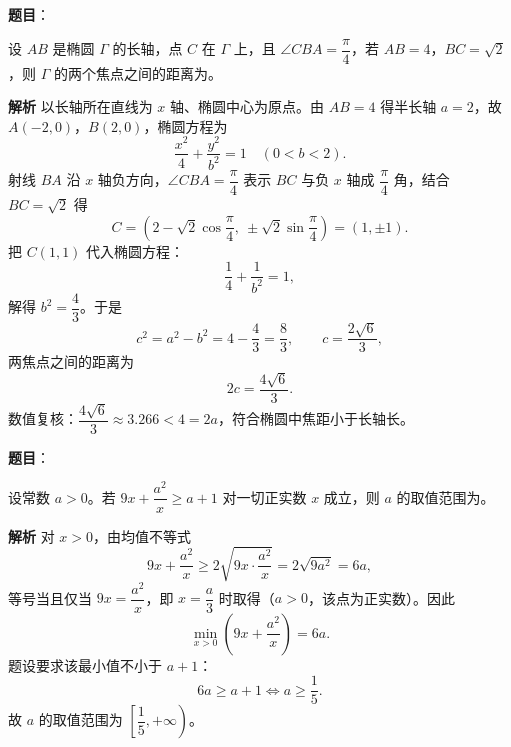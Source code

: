 \begin{answer}

\textbf{题目}：

设 $AB$ 是椭圆 $\Gamma$ 的长轴，点 $C$ 在 $\Gamma$ 上，且 $\angle CBA=\dfrac{\pi}{4}$，若 $AB=4$，$BC=\sqrt2$，则 $\Gamma$ 的两个焦点之间的距离为\gkblank{}。

\textbf{解析}
以长轴所在直线为 $x$ 轴、椭圆中心为原点。由 $AB=4$ 得半长轴 $a=2$，故 $A(-2,0)$，$B(2,0)$，椭圆方程为
\nopagebreak[4]
\[\frac{x^2}4+\frac{y^2}{b^2}=1\quad(0<b<2).\]
射线 $BA$ 沿 $x$ 轴负方向，$\angle CBA=\dfrac\pi4$ 表示 $BC$ 与负 $x$ 轴成 $\dfrac\pi4$ 角，结合 $BC=\sqrt2$ 得
\nopagebreak[4]
\[C=\left(2-\sqrt2\cos\frac\pi4,\ \pm\sqrt2\sin\frac\pi4\right)=(1,\pm1).\]
把 $C(1,1)$ 代入椭圆方程：
\nopagebreak[4]
\[\frac14+\frac1{b^2}=1,\]
解得 $b^2=\dfrac43$。于是
\nopagebreak[4]
\[c^2=a^2-b^2=4-\frac43=\frac83,\qquad c=\frac{2\sqrt6}3,\]
两焦点之间的距离为
\nopagebreak[4]
\[2c=\frac{4\sqrt6}3.\]
数值复核：$\dfrac{4\sqrt6}3\approx3.266<4=2a$，符合椭圆中焦距小于长轴长。


\end{answer}
\begin{answer}

\textbf{题目}：

设常数 $a>0$。若 $9x+\dfrac{a^2}{x}\geqslant a+1$ 对一切正实数 $x$ 成立，则 $a$ 的取值范围为\gkblank{}。

\textbf{解析}
对 $x>0$，由均值不等式
\nopagebreak[4]
\[9x+\frac{a^2}x\geqslant2\sqrt{9x\cdot\frac{a^2}x}=2\sqrt{9a^2}=6a,\]
等号当且仅当 $9x=\dfrac{a^2}x$，即 $x=\dfrac a3$ 时取得（$a>0$，该点为正实数）。因此
\nopagebreak[4]
\[\min_{x>0}\left(9x+\frac{a^2}x\right)=6a.\]
题设要求该最小值不小于 $a+1$：
\nopagebreak[4]
\[6a\geqslant a+1\iff a\geqslant\frac15.\]
故 $a$ 的取值范围为 $\left[\dfrac15,+\infty\right)$。

\gkanswer{答案：$\left[\dfrac15,+\infty\right)$。由均值不等式 $9x+\dfrac{a^2}x\geqslant2\sqrt{9a^2}=6a$（等号在 $x=\dfrac a3$ 取得），故只需 $6a\geqslant a+1$，即 $a\geqslant\dfrac15$。}

\end{answer}
